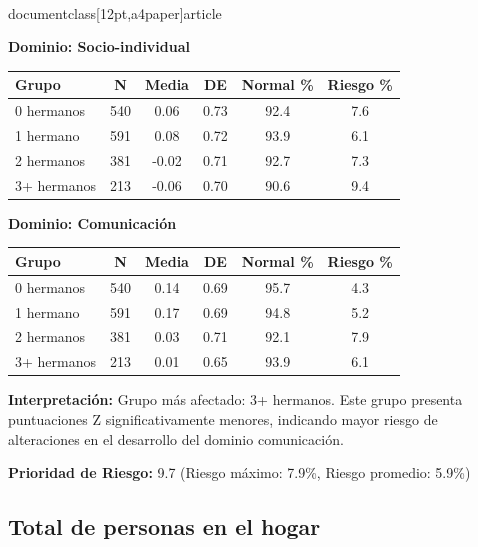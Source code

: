 \\documentclass[12pt,a4paper]{article}
\begin{document}
\vspace{0.5cm}


\textbf{Dominio: Socio-individual}


\begin{center}
\begin{tabular}{|l|c|c|c|c|c|}
\hline
\textbf{Grupo} & \textbf{N} & \textbf{Media} & \textbf{DE} & \textbf{Normal \%} & \textbf{Riesgo \%} \\
\hline
0 hermanos & 540 & 0.06 & 0.73 & 92.4 & 7.6 \\
1 hermano & 591 & 0.08 & 0.72 & 93.9 & 6.1 \\
2 hermanos & 381 & -0.02 & 0.71 & 92.7 & 7.3 \\
3+ hermanos & 213 & -0.06 & 0.70 & 90.6 & 9.4 \\

\hline
\end{tabular}
\end{center}


\vspace{0.5cm}


\textbf{Dominio: Comunicación}


\begin{center}
\begin{tabular}{|l|c|c|c|c|c|}
\hline
\textbf{Grupo} & \textbf{N} & \textbf{Media} & \textbf{DE} & \textbf{Normal \%} & \textbf{Riesgo \%} \\
\hline
0 hermanos & 540 & 0.14 & 0.69 & 95.7 & 4.3 \\
1 hermano & 591 & 0.17 & 0.69 & 94.8 & 5.2 \\
2 hermanos & 381 & 0.03 & 0.71 & 92.1 & 7.9 \\
3+ hermanos & 213 & 0.01 & 0.65 & 93.9 & 6.1 \\

\hline
\end{tabular}
\end{center}


\textbf{Interpretación:} Grupo más afectado: 3+ hermanos. Este grupo presenta puntuaciones Z significativamente menores, indicando mayor riesgo de alteraciones en el desarrollo del dominio comunicación.

\textbf{Prioridad de Riesgo:} 9.7 (Riesgo máximo: 7.9\%, Riesgo promedio: 5.9\%)


\vspace{0.5cm}


\subsection{Total de personas en el hogar}
\end{document}
